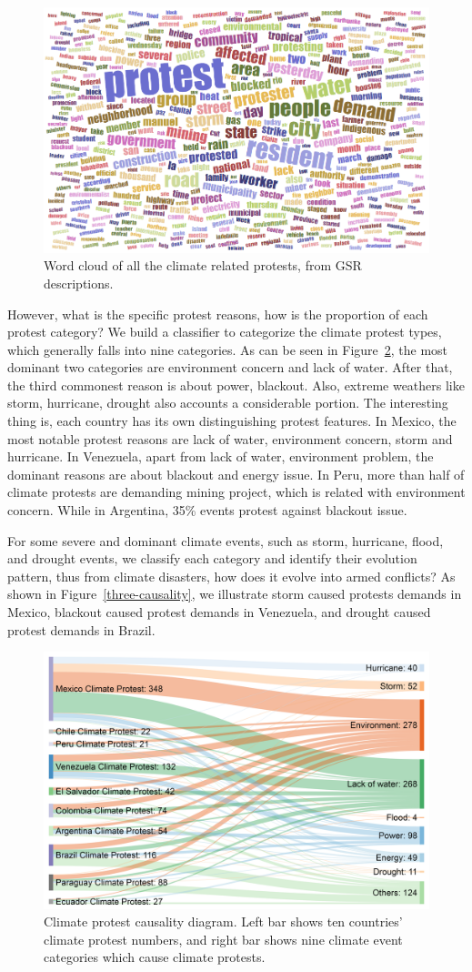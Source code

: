 \documentclass[9pt,twocolumn,twoside]{pnas-new}
\begin{document}
\begin{figure}[ht]
\centerline
{\includegraphics[width=.35\textwidth]{figures/Climate_word_cloud}}
\caption{Word cloud of all the climate related protests, from GSR descriptions.}
\label{wordcloud}
\end{figure}

However, what is the specific protest reasons, how is the proportion of each protest category? We build a classifier to categorize the climate protest types, which generally falls into nine categories. As can be seen in Figure~\ref{causality}, the most dominant two categories are environment concern and lack of water. After that, the third commonest reason is about power, blackout. Also, extreme weathers like storm, hurricane, drought also accounts a considerable portion. The interesting thing is, each country has its own distinguishing protest features. In Mexico, the most notable protest reasons are lack of water, environment concern, storm and hurricane. In Venezuela, apart from lack of water, environment problem, the dominant reasons are about blackout and energy issue. In Peru, more than half of climate protests are demanding mining project, which is related with environment concern. While in Argentina, 35\% events protest against blackout issue.

For some severe and dominant climate events, such as storm, hurricane, flood, and drought events, we classify each category and identify their evolution pattern, thus from climate disasters, how does it evolve into armed conflicts? As shown in Figure~\ref{three-causality}, we illustrate storm caused protests demands in Mexico, blackout caused protest demands in Venezuela, and drought caused protest demands in Brazil.

\begin{figure}[ht]
\centerline
{\includegraphics[width=.4\textwidth]{figures/causality1}}
\caption{Climate protest causality diagram. Left bar shows ten countries' climate protest numbers, and right bar shows nine climate event categories which cause climate protests.}
\label{causality}
\end{figure}
\end{document}
